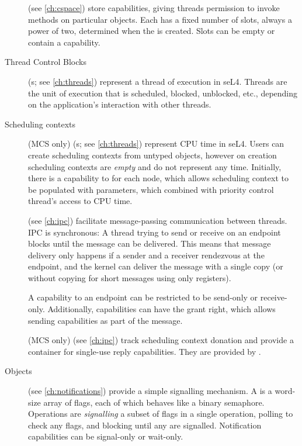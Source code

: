\begin{description}

    \item[] (see \autoref{ch:cspace}) store capabilities, giving threads permission to
    invoke methods on particular objects.
    Each  has a fixed number of slots,
    always a power of two, determined when the  is created. Slots
    can be empty or contain a capability.

    \item[Thread Control Blocks] (s; see \autoref{ch:threads}) represent a thread of
    execution in seL4. Threads are the unit of execution that is
    scheduled, blocked, unblocked, etc., depending on the application's
    interaction with other threads.

   \item[Scheduling contexts] (MCS only) (s; see \autoref{ch:threads}) represent
       CPU time in seL4. Users can create scheduling contexts from untyped objects, however on
       creation scheduling contexts are \textit{empty} and do not represent any time.
       Initially, there is a capability to  for each node, which
       allows scheduling context to be populated with parameters, which combined with priority
       control thread's access to CPU time.

    \item[] (see \autoref{ch:ipc}) facilitate message-passing
    communication between threads. IPC is synchronous: A thread
    trying to send or receive on an endpoint blocks until the message
    can be delivered. This means that message delivery only happens if
    a sender and a receiver rendezvous at the endpoint, and the
    kernel can deliver the message with a single copy (or without
    copying for short messages using only registers).

    A capability to an endpoint can be restricted to be
    send-only or receive-only. Additionally, 
    capabilities can have the grant right, which allows sending
    capabilities as part of the message.

   \item[] (MCS only) (see \autoref{ch:ipc}) track scheduling
    context donation and provide a container for single-use reply capabilities.
    They are provided by .

    \item[ Objects] (see \autoref{ch:notifications})
      provide a simple signalling mechanism. A 
      is a word-size array of flags, each of which behaves like a binary semaphore. Operations
      are \emph{signalling} a subset of flags in a single operation,
      polling to check any flags,
      and blocking until any are signalled. Notification capabilities
      can be signal-only or wait-only.


\end{description}

